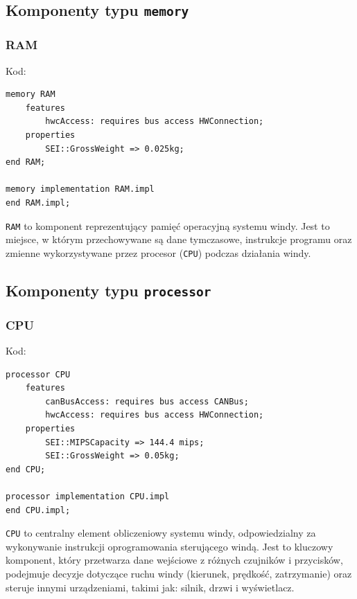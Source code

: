 \documentclass{article}
\begin{document}
    \subsection{Komponenty typu \texttt{memory}}

    
    \subsubsection{RAM}

    Kod:
    
    \begin{lstlisting}[basicstyle=\ttfamily, keywordstyle=\bfseries]
memory RAM
    features
        hwcAccess: requires bus access HWConnection;
    properties
        SEI::GrossWeight => 0.025kg;
end RAM;

memory implementation RAM.impl
end RAM.impl;
    \end{lstlisting}

    \texttt{RAM} to komponent reprezentujący pamięć operacyjną systemu windy. Jest to miejsce, w którym przechowywane są dane tymczasowe, instrukcje programu oraz zmienne wykorzystywane przez procesor (\texttt{CPU}) podczas działania windy. 



    \subsection{Komponenty typu \texttt{processor}}

    
    \subsubsection{CPU}

    Kod:
    
    \begin{lstlisting}[basicstyle=\ttfamily, keywordstyle=\bfseries]
processor CPU
    features
        canBusAccess: requires bus access CANBus;
        hwcAccess: requires bus access HWConnection;
    properties
        SEI::MIPSCapacity => 144.4 mips;
        SEI::GrossWeight => 0.05kg;
end CPU;

processor implementation CPU.impl
end CPU.impl;
    \end{lstlisting}

    \texttt{CPU} to centralny element obliczeniowy systemu windy, odpowiedzialny za wykonywanie instrukcji oprogramowania sterującego windą. Jest to kluczowy komponent, który przetwarza dane wejściowe z różnych czujników i przycisków, podejmuje decyzje dotyczące ruchu windy (kierunek, prędkość, zatrzymanie) oraz steruje innymi urządzeniami, takimi jak: silnik, drzwi i wyświetlacz. 
\end{document}
